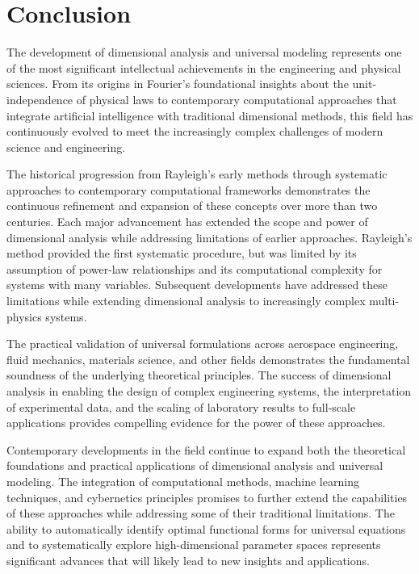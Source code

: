 \documentclass[
	11pt, %
	fleqn, %
	a4paper, %
]{LegrandOrangeBook}
\begin{document}
\section{Conclusion}

The development of dimensional analysis and universal modeling represents one of the most significant intellectual achievements in the engineering and physical sciences. From its origins in Fourier's foundational insights about the unit-independence of physical laws to contemporary computational approaches that integrate artificial intelligence with traditional dimensional methods, this field has continuously evolved to meet the increasingly complex challenges of modern science and engineering.

The historical progression from Rayleigh's early methods through systematic approaches to contemporary computational frameworks demonstrates the continuous refinement and expansion of these concepts over more than two centuries. Each major advancement has extended the scope and power of dimensional analysis while addressing limitations of earlier approaches. Rayleigh's method provided the first systematic procedure, but was limited by its assumption of power-law relationships and its computational complexity for systems with many variables. Subsequent developments have addressed these limitations while extending dimensional analysis to increasingly complex multi-physics systems.

The practical validation of universal formulations across aerospace engineering, fluid mechanics, materials science, and other fields demonstrates the fundamental soundness of the underlying theoretical principles. The success of dimensional analysis in enabling the design of complex engineering systems, the interpretation of experimental data, and the scaling of laboratory results to full-scale applications provides compelling evidence for the power of these approaches.

Contemporary developments in the field continue to expand both the theoretical foundations and practical applications of dimensional analysis and universal modeling. The integration of computational methods, machine learning techniques, and cybernetics principles promises to further extend the capabilities of these approaches while addressing some of their traditional limitations. The ability to automatically identify optimal functional forms for universal equations and to systematically explore high-dimensional parameter spaces represents significant advances that will likely lead to new insights and applications.
\end{document}
